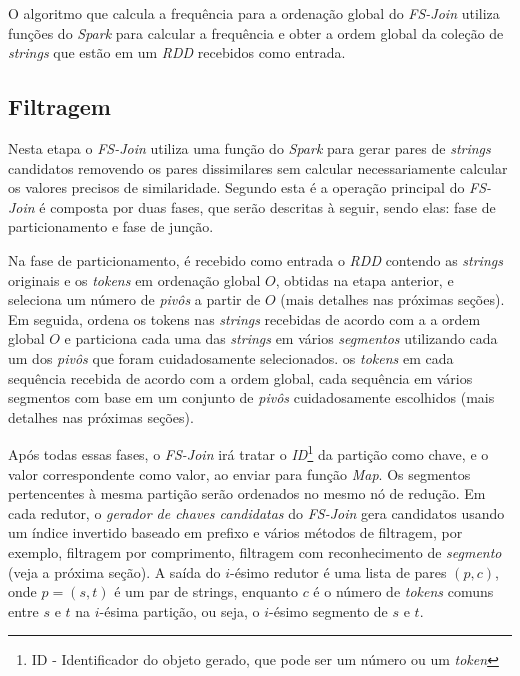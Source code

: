 O algoritmo que calcula a frequência para a ordenação global do\textit{ FS-Join} utiliza funções do \textit{Spark} para calcular a frequência e obter a ordem global da coleção de \textit{strings} que estão em um \textit{RDD} recebidos como entrada.

\subsection{Filtragem}

Nesta etapa o \textit{FS-Join} utiliza uma função do \textit{Spark} para gerar pares de \textit{strings} candidatos removendo os pares dissimilares sem calcular necessariamente calcular os valores precisos de similaridade.  Segundo \cite{Rong:2017:FS-Join} esta é a operação principal do \textit{FS-Join} é composta por duas fases, que serão descritas à seguir, sendo elas: fase de particionamento e fase de junção. 

Na fase de particionamento, é recebido como entrada o \textit{RDD} contendo as \textit{strings} originais e os \textit{tokens} em ordenação global $O$, obtidas na etapa anterior, e seleciona um número de \textit{pivôs} a partir de $O$ (mais detalhes nas próximas seções). Em seguida, ordena os {tokens} nas \textit{strings} recebidas de acordo com a a ordem global $O$ e particiona cada uma das \textit{strings} em vários \textit{segmentos} utilizando cada um dos \textit{pivôs} que foram cuidadosamente selecionados.  os \textit{tokens} em cada sequência recebida de acordo com a ordem global, cada sequência em vários segmentos com base em um conjunto de \textit{pivôs} cuidadosamente escolhidos (mais detalhes nas próximas seções). 

Após todas essas fases, o \textit{FS-Join} irá tratar o \textit{ID}\footnote{ID - Identificador do objeto gerado, que pode ser um número ou um \textit{token}} da partição como chave,  e o valor correspondente como valor, ao enviar para função \textit{Map}.  Os segmentos pertencentes à mesma partição serão ordenados no mesmo nó de redução. Em cada redutor, o \textit{gerador de chaves candidatas} do \textit{FS-Join} gera candidatos usando um índice invertido baseado em prefixo e vários métodos de filtragem, por exemplo, filtragem por comprimento, filtragem com reconhecimento de \textit{segmento} (veja a próxima seção). A saída do $i$-ésimo redutor é uma lista de pares $(p, c)$, onde $p = (s, t)$ é um par de strings, enquanto $c$ é o número de \textit{tokens} comuns entre $s$ e $t$ na $i$-ésima partição, ou seja, o $i$-ésimo segmento de $s$ e $t$.

